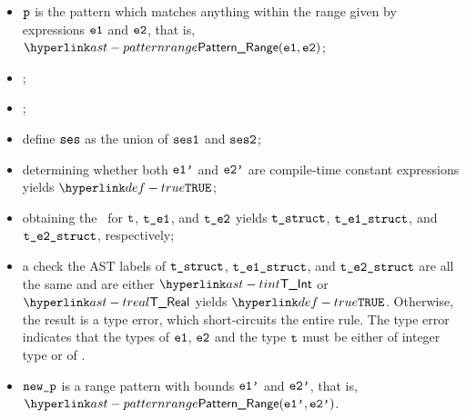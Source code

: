 \ProseParagraph
\AllApply
\begin{itemize}
  \item $\vp$ is the pattern which matches anything within the range given by
  expressions $\veone$ and $\vetwo$, that is, $\PatternRange(\veone, \vetwo)$;
  \item \Proseannotatesymbolicallyevaluableexpr{$\tenv$}{$\veone$}{$(\vteone, \veonep, \vsesone)$}\ProseOrTypeError;
  \item \Proseannotatesymbolicallyevaluableexpr{$\tenv$}{$\vetwo$}{$(\vtetwo, \vetwop, \vsestwo)$}\ProseOrTypeError;
  \item define $\vses$ as the union of $\vsesone$ and $\vsestwo$;
  \item determining whether both $\veonep$ and $\vetwop$ are compile-time constant expressions yields $\True$\ProseOrTypeError;
  \item obtaining the \underlyingtype\ for $\vt$, $\vteone$, and $\vtetwo$ yields
        $\vtstruct$, $\vteonestruct$, and $\vtetwostruct$, respectively\ProseOrTypeError;
  \item a check the AST labels of $\vtstruct$, $\vteonestruct$, and $\vtetwostruct$ are all the same and are either
        $\TInt$ or $\TReal$ yields $\True$. Otherwise, the result is a type error, which short-circuits the entire rule.
        The type error indicates that the types of
        $\veone$, $\vetwo$ and the type $\vt$ must be either of integer type or of \realtypeterm{}.
  \item $\newp$ is a range pattern with bounds $\veonep$ and $\vetwop$, that is, $\PatternRange(\veonep, \vetwop)$.
\end{itemize}
\FormallyParagraph
\begin{mathpar}
\end{mathpar}
